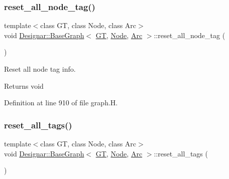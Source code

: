 \subsubsection{\texorpdfstring{reset\+\_\+all\+\_\+node\+\_\+tag()}{reset\_all\_node\_tag()}\hspace{0.1cm}{\footnotesize\ttfamily [2/2]}}
{\footnotesize\ttfamily template$<$class GT, class Node, class Arc$>$ \\
void \hyperlink{class_designar_1_1_base_graph}{Designar\+::\+Base\+Graph}$<$ \hyperlink{demo-buildgraph_8_c_a3001c40d2c31ca87ed96cd7d1334a55e}{GT}, \hyperlink{namespace_designar_a5af326c65aa2bd26b26c410f2030d09e}{Node}, \hyperlink{namespace_designar_a3f55fb5513d62ff47cbc8f72b8e95d6f}{Arc} $>$\+::reset\+\_\+all\+\_\+node\+\_\+tag (\begin{DoxyParamCaption}{ }\end{DoxyParamCaption})\hspace{0.3cm}{\ttfamily [inline]}}



Reset all node tag info. 

\begin{DoxyReturn}{Returns}
void 
\end{DoxyReturn}


Definition at line 910 of file graph.\+H.

\mbox{\label{class_designar_1_1_base_graph_ae62e72668468a2aaa3ddc91246e1ee1c}} 
\subsubsection{\texorpdfstring{reset\+\_\+all\+\_\+tags()}{reset\_all\_tags()}}
{\footnotesize\ttfamily template$<$class GT, class Node, class Arc$>$ \\
void \hyperlink{class_designar_1_1_base_graph}{Designar\+::\+Base\+Graph}$<$ \hyperlink{demo-buildgraph_8_c_a3001c40d2c31ca87ed96cd7d1334a55e}{GT}, \hyperlink{namespace_designar_a5af326c65aa2bd26b26c410f2030d09e}{Node}, \hyperlink{namespace_designar_a3f55fb5513d62ff47cbc8f72b8e95d6f}{Arc} $>$\+::reset\+\_\+all\+\_\+tags (\begin{DoxyParamCaption}{ }\end{DoxyParamCaption})\hspace{0.3cm}{\ttfamily [inline]}}



